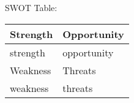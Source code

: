 SWOT Table:



\begin{center}
\begin{tabular}{ | p{6cm} || p{6cm} | }
    \hline
    \hline
    Strength & Opportunity \\ \hline
    \hline
    {{ strength }} & {{ opportunity }}  \\[100pt] \hline
    \hline
    Weakness & Threats \\ \hline
    \hline
    {{ weakness }} & {{ threats }}  \\[100pt] \hline
    \hline
  \end{tabular}
\end{center}